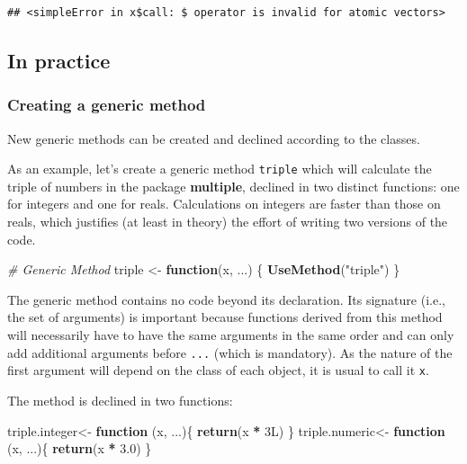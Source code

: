 \documentclass[
  12pt,
  american,
  a4paper,
  extrafontsizes,onecolumn,openright
  ]{memoir}
\newenvironment{Shaded}{\begin{snugshade}}{\end{snugshade}}
\newcommand{\CommentTok}[1]{\textcolor[rgb]{0.56,0.35,0.01}{\textit{#1}}}
\newcommand{\ControlFlowTok}[1]{\textcolor[rgb]{0.13,0.29,0.53}{\textbf{#1}}}
\newcommand{\DataTypeTok}[1]{\textcolor[rgb]{0.13,0.29,0.53}{#1}}
\newcommand{\DecValTok}[1]{\textcolor[rgb]{0.00,0.00,0.81}{#1}}
\newcommand{\FloatTok}[1]{\textcolor[rgb]{0.00,0.00,0.81}{#1}}
\newcommand{\FunctionTok}[1]{\textcolor[rgb]{0.13,0.29,0.53}{\textbf{#1}}}
\newcommand{\NormalTok}[1]{#1}
\newcommand{\OtherTok}[1]{\textcolor[rgb]{0.56,0.35,0.01}{#1}}
\newcommand{\SpecialCharTok}[1]{\textcolor[rgb]{0.81,0.36,0.00}{\textbf{#1}}}
\newcommand{\StringTok}[1]{\textcolor[rgb]{0.31,0.60,0.02}{#1}}
\begin{document}
\begin{verbatim}
## <simpleError in x$call: $ operator is invalid for atomic vectors>
\end{verbatim}

\normalsize

\subsection{In practice}\label{in-practice}

\subsubsection{Creating a generic method}\label{creating-a-generic-method}

New generic methods can be created and declined according to the classes.

As an example, let's create a generic method \texttt{triple} which will calculate the triple of numbers in the package \textbf{multiple}, declined in two distinct functions: one for integers and one for reals.
Calculations on integers are faster than those on reals, which justifies (at least in theory) the effort of writing two versions of the code.

\scriptsize

\begin{Shaded}
\begin{Highlighting}[]
\CommentTok{\# Generic Method}
\NormalTok{triple }\OtherTok{\textless{}{-}} \ControlFlowTok{function}\NormalTok{(x, ...) \{}
    \FunctionTok{UseMethod}\NormalTok{(}\StringTok{"triple"}\NormalTok{)}
\NormalTok{\}}
\end{Highlighting}
\end{Shaded}

\normalsize

The generic method contains no code beyond its declaration.
Its signature (i.e., the set of arguments) is important because functions derived from this method will necessarily have to have the same arguments in the same order and can only add additional arguments before \texttt{...} (which is mandatory).
As the nature of the first argument will depend on the class of each object, it is usual to call it \texttt{x}.

The method is declined in two functions:

\scriptsize

\begin{Shaded}
\begin{Highlighting}[]
\NormalTok{triple.integer}\OtherTok{\textless{}{-}} \ControlFlowTok{function}\NormalTok{ (x, ...)\{}
  \FunctionTok{return}\NormalTok{(x }\SpecialCharTok{*} \DecValTok{3}\DataTypeTok{L}\NormalTok{)}
\NormalTok{\}}
\NormalTok{triple.numeric}\OtherTok{\textless{}{-}} \ControlFlowTok{function}\NormalTok{ (x, ...)\{}
  \FunctionTok{return}\NormalTok{(x }\SpecialCharTok{*} \FloatTok{3.0}\NormalTok{)}
\NormalTok{\}}
\end{Highlighting}
\end{Shaded}
\end{document}
